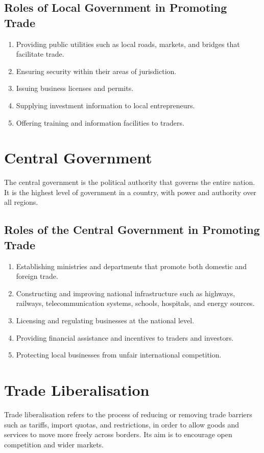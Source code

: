 \documentclass[12pt,a4paper, openany]{book}
\begin{document}
\subsection{Roles of Local Government in Promoting Trade}
\begin{enumerate}
	\item Providing public utilities such as local roads, markets, and bridges that facilitate trade.
	\item Ensuring security within their areas of jurisdiction.
	\item Issuing business licenses and permits.
	\item Supplying investment information to local entrepreneurs.
	\item Offering training and information facilities to traders.
\end{enumerate}

\section{Central Government}
The central government is the political authority that governs the entire nation.
It is the highest level of government in a country, with power and authority over all regions.

\subsection{Roles of the Central Government in Promoting Trade}
\begin{enumerate}
	\item Establishing ministries and departments that promote both domestic and foreign trade.
	\item Constructing and improving national infrastructure such as highways, railways, telecommunication systems, schools, hospitals, and energy sources.
	\item Licensing and regulating businesses at the national level.
	\item Providing financial assistance and incentives to traders and investors.
	\item Protecting local businesses from unfair international competition.
\end{enumerate}

\section{Trade Liberalisation}
Trade liberalisation refers to the process of reducing or removing trade barriers such as tariffs, import quotas, and restrictions,
in order to allow goods and services to move more freely across borders.
Its aim is to encourage open competition and wider markets.
\end{document}
